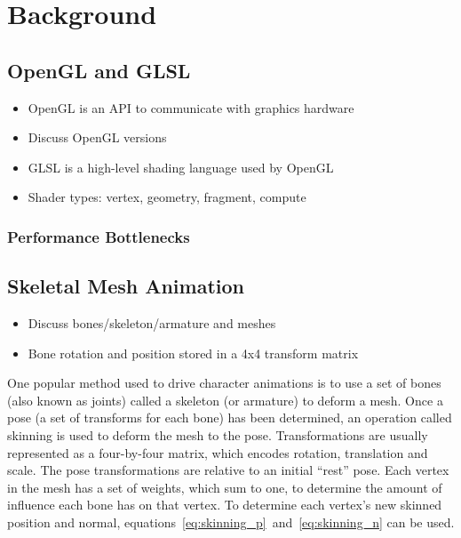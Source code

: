 \section{Background}

\subsection{OpenGL and GLSL}
\ifsummaries
\begin{itemize}
 \item OpenGL is an API to communicate with graphics hardware
 \item Discuss OpenGL versions
 \item GLSL is a high-level shading language used by OpenGL
 \item Shader types: vertex, geometry, fragment, compute
\end{itemize}
\fi


\subsubsection{Performance Bottlenecks}


\subsection{Skeletal Mesh Animation}
\ifsummaries
\begin{itemize}
 \item Discuss bones/skeleton/armature and meshes
 \item Bone rotation and position stored in a 4x4 transform matrix
\end{itemize}
\fi

One popular method used to drive character animations is to use a set of bones (also known as joints) called a skeleton (or armature) to deform a mesh.
Once a pose (a set of transforms for each bone) has been determined, an operation called skinning is used to deform the mesh to the pose.
Transformations are usually represented as a four-by-four matrix, which encodes rotation, translation and scale.
The pose transformations are relative to an initial ``rest'' pose.
Each vertex in the mesh has a set of weights, which sum to one, to determine the amount of influence each bone has on that vertex.
To determine each vertex's new skinned position and normal, equations~\ref{eq:skinning_p}~and~\ref{eq:skinning_n} can be used.

